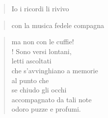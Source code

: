
\begin{verse}
    Io i ricordi li rivivo\\    
\end{verse}

\vspace{-0.9cm}
\begin{verse}
    con la musica \hfill fedele compagna
\end{verse}

\vspace{-0.9cm}
\begin{verse}
    ma non con le cuffie!\\!
    Sono versi lontani,\\
    letti ascoltati\\
    che s'avvinghiano a memorie\\
    al punto che\\
    se chiudo gli occhi\\
    accompagnato da tali note\\
    odoro puzze e profumi.
\end{verse}